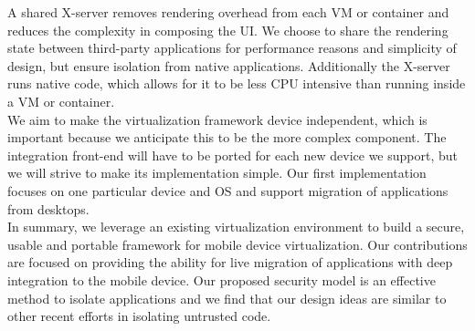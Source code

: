 A shared X-server removes rendering overhead from each VM or container and reduces the complexity in composing the UI. We choose to share the rendering state between third-party applications for performance reasons and simplicity of design, but ensure isolation from native applications. Additionally the X-server runs native code, which allows for it to be less CPU intensive than running inside a VM or container. \\

We aim to make the virtualization framework device independent, which is important because we anticipate this to be the more complex component. The integration front-end will have to be ported for each new device we support, but we will strive to make its implementation simple. Our first implementation focuses on one particular device and OS and support  migration of applications from desktops. \\

In summary, we leverage an existing virtualization environment to build a secure, usable and portable framework for mobile device virtualization. Our contributions are focused on providing the ability for live migration of applications with deep integration to the mobile device. Our proposed security model is an effective method to isolate applications and we find that our design ideas are similar to other recent efforts \cite{grier2008secure} in isolating untrusted code.
